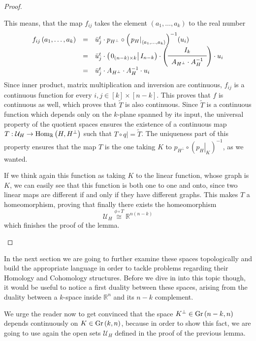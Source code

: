 \begin{proof}
\begin{b_item}
This means, that the map $f_{ij}$ takes the element $\left(a_1,\ldots,a_k\right)$ to the real number
\[\begin{array}{rcl}f_{ij}\left(a_1,\ldots,a_k\right)
&=&\bar{u}_j^t\cdot p_{H^{\perp}}\circ{\left(\left.p_H\right|_{\left<a_1,\ldots,a_k\right>}\right)}^{-1}(u_i)\\
&=&\bar{u}_j^t\cdot\left(\left.0_{(n-k)\times k}\right|I_{n-k}\right)\cdot\left(\begin{array}{c}I_k\\\midrule A_{H^{\perp}}\cdot A_H^{-1}\\\end{array}\right)\cdot u_i\\
&=&\bar{u}_j^t\cdot A_{H^{\perp}}\cdot A_H^{-1}\cdot u_i\\
\end{array}\]
Since inner product, matrix multiplication and inversion are continuous, $f_{ij}$ is a continuous function for every $i,j\in[k]\times[n-k]$. This proves that $f$ is continuous as well, which proves that $\tilde T$ is also continuous. Since $\tilde T$ is a continuous function which depends only on the $k$-plane spanned by its input, the universal property of the quotient spaces ensures the existence of a continuous map $T:\mathcal{U}_H\to\mathrm{Hom}_{\mathbb{R}}\left(H,H^{\perp}\right)$ such that $T\circ \left.q\right|=\tilde T$. The uniqueness part of this property ensures that the map $T$ is the one taking $K$ to $p_{H^{\perp}}\circ{\left(\left.p_H\right|_K\right)}^{-1}$, as we wanted.

If we think again this function as taking $K$ to the linear function, whose graph is $K$, we can easily see that this function is both one to one and onto, since two linear maps are different if and only if they have different graphs. This makes $T$ a homeomorphism, proving that finally there exists the homeomorphism
\[\mathcal{U}_H\overset{\phi\circ T}{\cong}\mathbb{R}^{n(n-k)}\]
which finishes the proof of the lemma.\qedhere
\end{b_item}
\end{proof}
In the next section we are going to further examine these spaces topologically and build the appropriate language in order to tackle problems regarding their Homology and Cohomology structures. Before we dive in into this topic though, it would be useful to notice a first duality between these spaces, arising from the duality between a $k$-space inside $\mathbb{R}^n$ and its $n-k$ complement.

We urge the reader now to get convinced that the space $K^{\perp}\in\Gr{n-k}{n}$ depends continuously on $K\in\Gr{k}{n}$, because in order to show this fact, we are going to use again the open sets $\mathcal{U}_H$ defined in the proof of the previous lemma.

